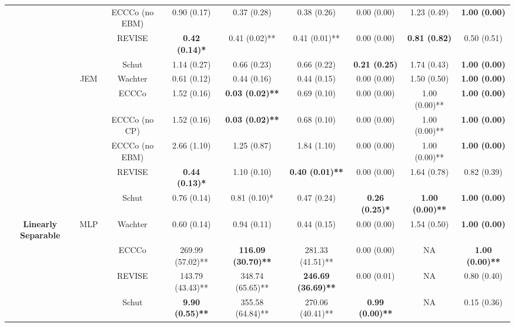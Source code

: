 \begin{table}
{\begin{tabular}[t]{>{}c|c|c|c|c|c|c|c|c}
 &  & ECCCo (no EBM) & 0.90 (0.17) & 0.37 (0.28) & 0.38 (0.26) & 0.00 (0.00) & 1.23 (0.49) & \textbf{1.00 (0.00)}\\

 &  & REVISE & \textbf{0.42 (0.14)*} & 0.41 (0.02)** & 0.41 (0.01)** & 0.00 (0.00) & \textbf{0.81 (0.82)} & 0.50 (0.51)\\

 &  & Schut & 1.14 (0.27) & 0.66 (0.23) & 0.66 (0.22) & \textbf{0.21 (0.25)} & 1.74 (0.43) & \textbf{1.00 (0.00)}\\

 & \multirow{-6}{*}{\centering\arraybackslash JEM} & Wachter & 0.61 (0.12) & 0.44 (0.16) & 0.44 (0.15) & 0.00 (0.00) & 1.50 (0.50) & \textbf{1.00 (0.00)}\\
\cline{2-9}
 &  & ECCCo & 1.52 (0.16) & \textbf{0.03 (0.02)**} & 0.69 (0.10) & 0.00 (0.00) & 1.00 (0.00)** & \textbf{1.00 (0.00)}\\

 &  & ECCCo (no CP) & 1.52 (0.16) & \textbf{0.03 (0.02)**} & 0.68 (0.10) & 0.00 (0.00) & 1.00 (0.00)** & \textbf{1.00 (0.00)}\\

 &  & ECCCo (no EBM) & 2.66 (1.10) & 1.25 (0.87) & 1.84 (1.10) & 0.00 (0.00) & 1.00 (0.00)** & \textbf{1.00 (0.00)}\\

 &  & REVISE & \textbf{0.44 (0.13)*} & 1.10 (0.10) & \textbf{0.40 (0.01)**} & 0.00 (0.00) & 1.64 (0.78) & 0.82 (0.39)\\

 &  & Schut & 0.76 (0.14) & 0.81 (0.10)* & 0.47 (0.24) & \textbf{0.26 (0.25)*} & \textbf{1.00 (0.00)**} & \textbf{1.00 (0.00)}\\

\multirow{-12}{*}{\centering\arraybackslash \textbf{Linearly Separable}} & \multirow{-6}{*}{\centering\arraybackslash MLP} & Wachter & 0.60 (0.14) & 0.94 (0.11) & 0.44 (0.15) & 0.00 (0.00) & 1.54 (0.50) & \textbf{1.00 (0.00)}\\
\cline{1-9}
 &  & ECCCo & 269.99 (57.02)** & \textbf{116.09 (30.70)**} & 281.33 (41.51)** & 0.00 (0.00) & NA & \textbf{1.00 (0.00)**}\\

 &  & REVISE & 143.79 (43.43)** & 348.74 (65.65)** & \textbf{246.69 (36.69)**} & 0.00 (0.01) & NA & 0.80 (0.40)\\

 &  & Schut & \textbf{9.90 (0.55)**} & 355.58 (64.84)** & 270.06 (40.41)** & \textbf{0.99 (0.00)**} & NA & 0.15 (0.36)\\


\end{tabular}}
\end{table}
